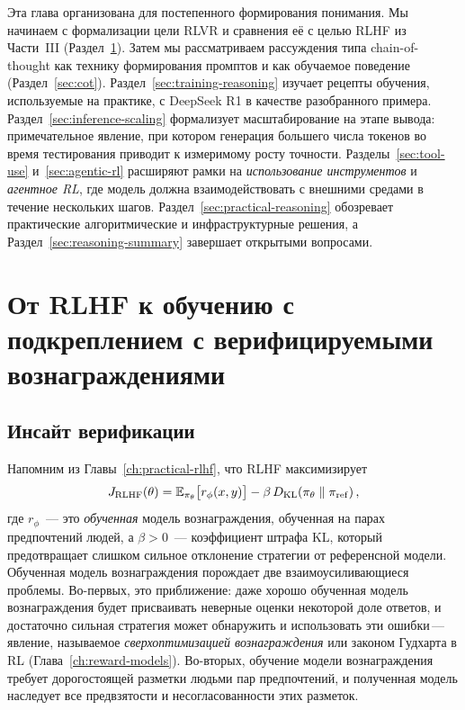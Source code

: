 Эта глава организована для постепенного формирования понимания. Мы начинаем
с формализации цели RLVR и сравнения её с
целью RLHF из Части~III
(Раздел~\ref{sec:rlvr-ch15}). Затем мы рассматриваем рассуждения типа chain-of-thought
как технику формирования промптов и как обучаемое
поведение (Раздел~\ref{sec:cot}). Раздел~\ref{sec:training-reasoning}
изучает рецепты обучения, используемые на практике, с DeepSeek R1 в качестве
разобранного примера. Раздел~\ref{sec:inference-scaling} формализует
масштабирование на этапе вывода: примечательное явление, при котором генерация большего числа
токенов во время тестирования приводит к измеримому росту точности.
Разделы~\ref{sec:tool-use} и~\ref{sec:agentic-rl} расширяют
рамки на \emph{использование инструментов} и \emph{агентное
RL}, где модель должна взаимодействовать с
внешними средами в течение нескольких шагов. Раздел~\ref{sec:practical-reasoning}
обозревает практические алгоритмические и инфраструктурные решения, а
Раздел~\ref{sec:reasoning-summary} завершает открытыми вопросами.

\section{От RLHF к обучению с подкреплением с верифицируемыми вознаграждениями}
\label{sec:rlvr-ch15}

\subsection{Инсайт верификации}

Напомним из Главы~\ref{ch:practical-rlhf}, что RLHF максимизирует
\begin{equation}
\label{eq:rlhf-objective-ch15}
J_{\mathrm{RLHF}}(\theta)
  = \operatorname{\mathbb{E}}_{\pi_\theta}\bigl[r_\phi(x, y)\bigr]
  - \beta\,D_{\mathrm{KL}}\!\left(\pi_\theta\;\|\;\pi_{\mathrm{ref}}\right),
\end{equation}
где $r_\phi$~--- это \emph{обученная} модель вознаграждения, обученная на парах предпочтений
людей, а $\beta > 0$~--- коэффициент штрафа KL, который
предотвращает слишком сильное отклонение стратегии от референсной модели.
Обученная модель вознаграждения порождает две взаимоусиливающиеся проблемы. Во-первых, это
приближение: даже хорошо обученная модель вознаграждения будет присваивать
неверные оценки некоторой доле ответов, и достаточно сильная стратегия может
обнаружить и использовать эти ошибки\,---\,явление,
называемое \emph{сверхоптимизацией вознаграждения}
или законом Гудхарта в RL (Глава~\ref{ch:reward-models}). Во-вторых,
обучение модели вознаграждения требует дорогостоящей разметки людьми пар
предпочтений, и полученная модель наследует все предвзятости и
несогласованности этих разметок.

